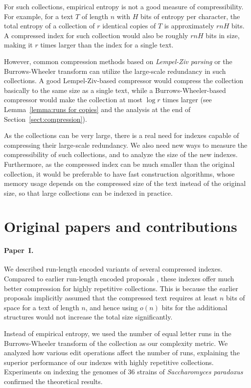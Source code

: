 For such collections, empirical entropy is not a good measure of
compressibility. For example, for a text $T$ of length $n$ with $H$ bits of
entropy per character, the total entropy of a collection of $r$ identical
copies of $T$ is approximately $rnH$ bits. A compressed index for such
collection would also be roughly $rnH$ bits in size, making it $r$ times
larger than the index for a single text.

However, common compression methods based on \emph{Lempel-Ziv parsing} or the
Burrows-Wheeler transform can utilize the large-scale redundancy in
such collections. A good Lempel-Ziv-based compressor would compress the collection
basically to the same size as a single text, while a Burrows-Wheeler-based
compressor would make the collection at most $\log r$ times larger (see Lemma~\ref{lemma:runs for copies} and the analysis at the end of Section~\ref{sect:compression}).

As the collections can be very large, there is a real need for indexes
capable of compressing their large-scale redundancy. We also need new ways to
measure the compressibility of such collections, and to analyze the size of the
new indexes. Furthermore, as the compressed index can be much smaller than
the original collection, it would be preferable to have fast construction algorithms,
whose memory usage depends on the compressed size of the text instead of the original size, so that large collections can be indexed in practice.


\section{Original papers and contributions}

\paragraph{Paper~I.}

We described run-length encoded variants of several compressed indexes. Compared to earlier run-length encoded proposals \cite{Sadakane2003,Maekinen2005}, these indexes offer much better compression for highly repetitive collections. This is because the earlier proposals implicitly assumed that the compressed text requires at least $n$ bits of space for a text of length $n$, and hence using $o(n)$ bits for the additional structures would not increase the total size significantly.

Instead of empirical entropy, we used the number of equal letter runs in the Burrows-Wheeler transform of the collection as our complexity metric. We analyzed how various edit operations affect the number of runs, explaining the superior performance of our indexes with highly repetitive collections. Experiments on indexing the genomes of 36 strains of \emph{Saccharomyces paradoxus} confirmed the theoretical results.

